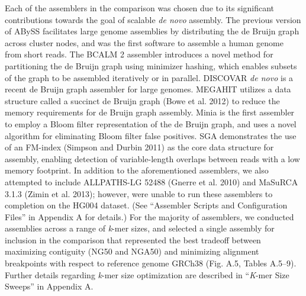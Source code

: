 \documentclass[
  12pt,
  oneside,
  openany]{book}
\begin{document}
Each of the assemblers in the comparison was chosen due to its significant contributions towards the goal of scalable \emph{de novo} assembly. The previous version of ABySS facilitates large genome assemblies by distributing the de Bruijn graph across cluster nodes, and was the first software to assemble a human genome from short reads. The BCALM 2 assembler introduces a novel method for partitioning the de Bruijn graph using minimizer hashing, which enables subsets of the graph to be assembled iteratively or in parallel. DISCOVAR \emph{de novo} is a recent de Bruijn graph assembler for large genomes. MEGAHIT utilizes a data structure called a succinct de Bruijn graph (Bowe et al. 2012) to reduce the memory requirements for de Bruijn graph assembly. Minia is the first assembler to employ a Bloom filter representation of the de Bruijn graph, and uses a novel algorithm for eliminating Bloom filter false positives. SGA demonstrates the use of an FM-index (Simpson and Durbin 2011) as the core data structure for assembly, enabling detection of variable-length overlaps between reads with a low memory footprint. In addition to the aforementioned assemblers, we also attempted to include ALLPATHS-LG 52488 (Gnerre et al. 2010) and MaSuRCA 3.1.3 (Zimin et al. 2013); however, were unable to run these assemblers to completion on the HG004 dataset. (See ``Assembler Scripts and Configuration Files'' in Appendix A for details.) For the majority of assemblers, we conducted assemblies across a range of \emph{k}-mer sizes, and selected a single assembly for inclusion in the comparison that represented the best tradeoff between maximizing contiguity (NG50 and NGA50) and minimizing alignment breakpoints with respect to reference genome GRCh38 (Fig. A.5, Tables A.5--9). Further details regarding \emph{k}-mer size optimization are described in ``\emph{K}-mer Size Sweeps'' in Appendix A.
\end{document}
